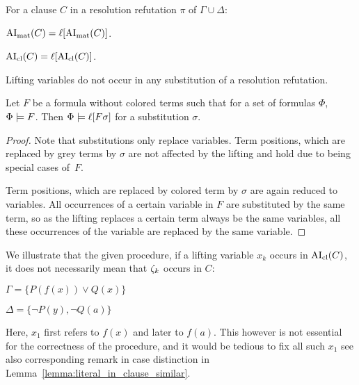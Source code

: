 \documentclass[,%
	paper=a4,%
	DIV14, %
	twoside=false,%
	liststotoc,
	bibtotoc,
	draft=false,%
	numbers=noendperiod
]{scrartcl}
\begin{document}
\begin{corr}
	\label{corr:lift_ai}
	For a clause $C$ in a resolution refutation $\pi$ of $\Gamma \cup \Delta$:
	\begin{compactenum}
	\item $\operatorname{AI}_\mathrm{mat}(C) = \ell[\operatorname{AI}_\mathrm{mat}(C)]$.

	\item $\operatorname{AI}_\mathrm{cl}(C) = \ell[\operatorname{AI}_\mathrm{cl}(C)]$.
	\end{compactenum}
\end{corr}

\begin{lemma}
	\label{lemma:no_lifting_vars_in_subst}
	Lifting variables do not occur in any substitution of a resolution refutation.
\end{lemma}

\begin{lemma}
	\label{lemma:substitute_and_lift}
	Let $F$ be a formula without colored terms such that for a set of formulas $\Phi$, $\Phi \models F$.
	Then $\Phi \models \ell[F\sigma]$ for a substitution $\sigma$.
\end{lemma}
\begin{proof}
	Note that substitutions only replace variables. Term positions, which are replaced by grey terms by $\sigma$ are not affected by the lifting and hold due to being special cases of~$F$.

	Term positions, which are replaced by colored term by $\sigma$ are again reduced to variables.
	All occurrences of a certain variable in $F$ are substituted by the same term, so as the lifting replaces a certain term always be the same variables, all these occurrences of the variable are replaced by the same variable.
\end{proof}

\begin{exa} 
	\label{exa:lifting_var_refers_to_different_term}
	We illustrate that the given procedure, if a lifting variable $x_k$ occurs in $\operatorname{AI}_\mathrm{cl}(C)$, it does not necessarily mean that $\zeta_{k}$ occurs in $C$:

	$\Gamma = \{P(f(x))\lor Q(x)\}$

	$\Delta = \{\lnot P(y), \lnot Q(a)\}$
	\begin{prooftree}



	\end{prooftree}
	Here, $x_1$ first refers to $f(x)$ and later to $f(a)$.
	This however is not essential for the correctness of the procedure, and it would be tedious to fix all such $x_1$ see also corresponding remark in case distinction in Lemma~\ref{lemma:literal_in_clause_similar}.
\end{exa} 
\end{document}
